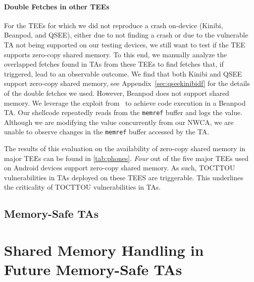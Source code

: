 \documentclass[conference]{IEEEtran} %
\newcommand{\sysname}{ScHMuzz\xspace}
\newcommand{\beanpod}{Beanpod\xspace}
\newcommand{\kinibi}{Kinibi\xspace}
\newcommand{\qsee}{QSEE\xspace}
\providecommand{\DIFaddtex}[1]{{\protect\color{blue} \sf #1}} %
\providecommand{\DIFdeltex}[1]{{\protect\color{red} \scriptsize #1}} %
\providecommand{\DIFaddbegin}{} %
\providecommand{\DIFaddend}{} %
\providecommand{\DIFdelbegin}{} %
\providecommand{\DIFdelend}{} %
\providecommand{\DIFadd}[1]{\texorpdfstring{\DIFaddtex{#1}}{#1}} %
\providecommand{\DIFdel}[1]{\texorpdfstring{\DIFdeltex{#1}}{}} %
\begin{document}
\paragraph{Double Fetches in other TEEs}

For the TEEs for which we did not reproduce a crash on-device (\kinibi, \beanpod, and 
\qsee), \DIFdelbegin \DIFdel{either due to }%
\DIFdel{not finding a crash or }\DIFdelend \DIFaddbegin \DIFadd{due to }\DIFaddend the vulnerable TA not 
being supported on our testing devices, we still want to test if the TEE supports 
zero-copy shared memory. To this end, we manually analyze the overlapped fetches found 
in TAs from these TEEs to find fetches that, if triggered, lead to an observable 
outcome. We find that both \kinibi and \qsee support zero-copy shared memory, see Appendix~\ref{sec:qseekinibidf} 
for the details of the double fetches we used. However, \beanpod does not support 
shared memory. We leverage the exploit from~\cite{globalconfusion} to 
achieve code execution in a \beanpod TA. Our shellcode repeatedly reads from the 
\texttt{memref} buffer and logs the value. Although we are modifying the value concurrently
from our NWCA, we are unable to observe changes in the \texttt{memref} buffer accessed by the TA.
\DIFaddbegin 

\DIFaddend The results of this evaluation on the availability of zero-copy shared memory in major TEEs 
can be found in \autoref{tab:phones}. \DIFaddbegin \emph{\DIFadd{Four}} \DIFadd{out of the five major TEEs used on 
Android devices support zero-copy shared memory. As such, TOCTTOU vulnerabilities in TAs 
deployed on these TEES are triggerable. This underlines the criticality of TOCTTOU 
vulnerabilities in TAs.
}\DIFaddend 


\DIFdelbegin \subsection{\DIFdel{Memory-Safe TAs}}
\addtocounter{subsection}{-1}%
\DIFdelend \DIFaddbegin \section{\DIFadd{Shared Memory Handling in Future Memory-Safe TAs}}\label{sec:rusttas}
\DIFaddend 
\end{document}
